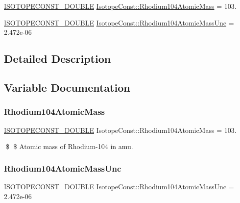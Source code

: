 \begin{DoxyCompactItemize}
\item 
\mbox{\hyperlink{group___isotope_const-_macros_ga8f45a7272ce02c0b4c65c44636ed719a}{I\+S\+O\+T\+O\+P\+E\+C\+O\+N\+S\+T\+\_\+\+D\+O\+U\+B\+LE}} \mbox{\hyperlink{group___isotope_const-_rhodium-_rh104_ga1c732acb6b42a890595a6f8b6a353c9a}{Isotope\+Const\+::\+Rhodium104\+Atomic\+Mass}} = 103.
\item 
\mbox{\hyperlink{group___isotope_const-_macros_ga8f45a7272ce02c0b4c65c44636ed719a}{I\+S\+O\+T\+O\+P\+E\+C\+O\+N\+S\+T\+\_\+\+D\+O\+U\+B\+LE}} \mbox{\hyperlink{group___isotope_const-_rhodium-_rh104_ga53f37ca4293ef8920280c7a6f7dee53d}{Isotope\+Const\+::\+Rhodium104\+Atomic\+Mass\+Unc}} = 2.\+472e-\/06
\end{DoxyCompactItemize}


\subsection{Detailed Description}


\subsection{Variable Documentation}
\mbox{\label{group___isotope_const-_rhodium-_rh104_ga1c732acb6b42a890595a6f8b6a353c9a}} 
\subsubsection{\texorpdfstring{Rhodium104\+Atomic\+Mass}{Rhodium104AtomicMass}}
{\footnotesize\ttfamily \mbox{\hyperlink{group___isotope_const-_macros_ga8f45a7272ce02c0b4c65c44636ed719a}{I\+S\+O\+T\+O\+P\+E\+C\+O\+N\+S\+T\+\_\+\+D\+O\+U\+B\+LE}} Isotope\+Const\+::\+Rhodium104\+Atomic\+Mass = 103.}

\$ \$ Atomic mass of Rhodium-\/104 in amu. \mbox{\label{group___isotope_const-_rhodium-_rh104_ga53f37ca4293ef8920280c7a6f7dee53d}} 
\subsubsection{\texorpdfstring{Rhodium104\+Atomic\+Mass\+Unc}{Rhodium104AtomicMassUnc}}
{\footnotesize\ttfamily \mbox{\hyperlink{group___isotope_const-_macros_ga8f45a7272ce02c0b4c65c44636ed719a}{I\+S\+O\+T\+O\+P\+E\+C\+O\+N\+S\+T\+\_\+\+D\+O\+U\+B\+LE}} Isotope\+Const\+::\+Rhodium104\+Atomic\+Mass\+Unc = 2.\+472e-\/06}

